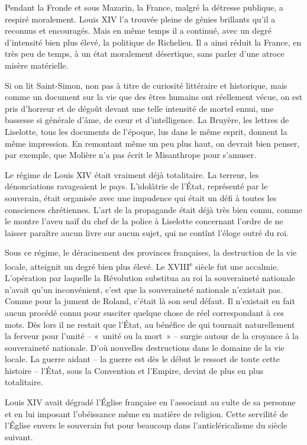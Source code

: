 \documentclass[french,twoside]{book} %
\begin{document}
Pendant la Fronde et sous Mazarin, la France, malgré la détresse publique, a respiré moralement. Louis XIV l'a trouvée pleine de génies brillants qu'il a reconnus et encouragés. Mais en même temps il a continué, avec un degré d'intensité bien plus élevé, la politique de Richelieu. Il a ainsi réduit la France, en très peu de temps, à un état moralement désertique, sans parler d'une atroce misère matérielle.\par
Si on lit Saint-Simon, non pas à titre de curiosité littéraire et historique, mais comme un document sur la vie que des êtres humains ont réellement vécue, on est pris d'horreur et de dégoût devant une telle intensité de mortel ennui, une bassesse si générale d'âme, de cœur et d'intelligence. La Bruyère, les lettres de Liselotte, tous les documents de l'époque, lus dans le même esprit, donnent la même impression. En remontant même un peu plus haut, on devrait bien penser, par exemple, que Molière n'a pas écrit le Misanthrope pour s'amuser.\par
Le régime de Louis XIV était vraiment déjà totalitaire. La terreur, les dénonciations ravageaient le pays. L'idolâtrie de l'État, représenté par le souverain, était organisée avec une impudence qui était un défi à toutes les consciences chrétiennes. L'art de la propagande était déjà très bien connu, comme le montre l'aveu naïf du chef de la police à Liselotte concernant l'ordre de ne laisser paraître aucun livre sur aucun sujet, qui ne contînt l'éloge outré du roi.\par
Sous ce régime, le déracinement des provinces françaises, la destruction de la vie locale, atteignit un degré bien plus élevé. Le XVIII\textsuperscript{e} siècle fut une accalmie. L'opération par laquelle la Révolution substitua au roi la souveraineté nationale n'avait qu'un inconvénient, c'est que la souveraineté nationale n'existait pas. Comme pour la jument de Roland, c'était là son seul défaut. Il n'existait en fait aucun procédé connu pour susciter quelque chose de réel correspondant à ces mots. Dès lors il ne restait que l'État, au bénéfice de qui tournait naturellement la ferveur pour l'unité – « unité ou la mort » – surgie autour de la croyance à la souveraineté nationale. D'où nouvelles destructions dans le domaine de la vie locale. La guerre aidant – la guerre est dès le début le ressort de toute cette histoire – l'État, sous la Convention et l'Empire, devint de plus en plus totalitaire.\par
Louis XIV avait dégradé l'Église française en l'associant au culte de sa personne et en lui imposant l'obéissance même en matière de religion. Cette servilité de l'Église envers le souverain fut pour beaucoup dans l'anticléricalisme du siècle suivant.\par
\end{document}
